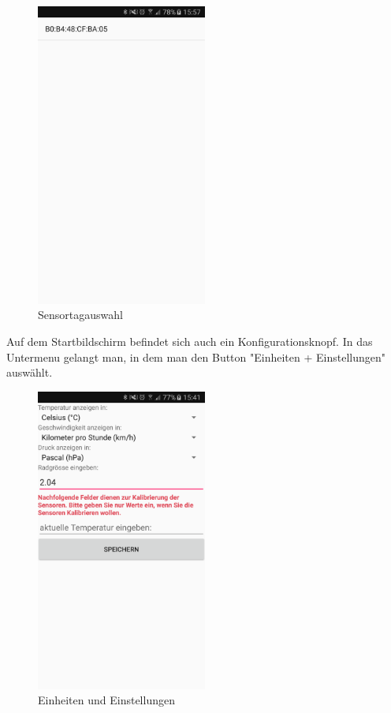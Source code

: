 \begin{figure}[ht]
    \includegraphics[width=0.5\textwidth]{4Resultate/imag/BLEAdresseAuswaehlen.png} 
    \caption{Sensortagauswahl}
    \label{sensorauswahl}
\end{figure}

Auf dem Startbildschirm befindet sich auch ein Konfigurationsknopf. In das Untermenu gelangt man, in dem man den Button "Einheiten + Einstellungen" auswählt.

\begin{figure}[ht]
    \includegraphics[width=0.5\textwidth]{4Resultate/imag/BLEEinheitenUndEinstellungenStart.png} 
    \caption{Einheiten und Einstellungen}
    \label{einheiten}
\end{figure}

